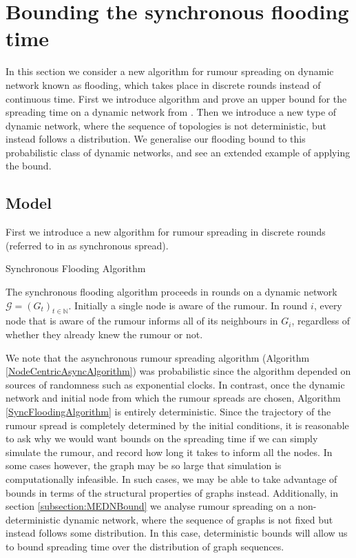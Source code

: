 \section{Bounding the synchronous flooding time}
\label{SyncFloodingSection}

In this section we consider a new algorithm for rumour spreading on dynamic network known as flooding, which takes place in discrete rounds instead of continuous time. First we introduce algorithm and prove an upper bound for the spreading time on a dynamic network from \cite{syncPaper}. Then we introduce a new type of dynamic network, where the sequence of topologies is not deterministic, but instead follows a distribution. We generalise our flooding bound to this probabilistic class of dynamic networks, and see an extended example of applying the bound.

\subsection{Model}

First we introduce a new algorithm for rumour spreading in discrete rounds (referred to in \cite{asyncPaper} as synchronous spread).

\begin{definition} \label{SyncFloodingAlgorithm}
	Synchronous Flooding Algorithm

	\noindent
	The synchronous flooding algorithm proceeds in rounds on a dynamic network $\mathcal{G} = (G_t)_{t \in \mathbb{N}}$. Initially a single node is aware of the rumour. In round $i$, every node that is aware of the rumour informs all of its neighbours in $G_i$, regardless of whether they already knew the rumour or not.
\end{definition}

We note that the asynchronous rumour spreading algorithm (Algorithm \ref{NodeCentricAsyncAlgorithm}) was probabilistic since the algorithm depended on sources of randomness such as exponential clocks. In contrast, once the dynamic network and initial node from which the rumour spreads are chosen, Algorithm \ref{SyncFloodingAlgorithm} is entirely deterministic. Since the trajectory of the rumour spread is completely determined by the initial conditions, it is reasonable to ask why we would want bounds on the spreading time if we can simply simulate the rumour, and record how long it takes to inform all the nodes. In some cases however, the graph may be so large that simulation is computationally infeasible. 
In such cases, we may be able to take advantage of bounds in terms of the structural properties of graphs instead. %
Additionally, in section \ref{subsection:MEDNBound}
we analyse rumour spreading on a non-deterministic dynamic network, where the sequence of graphs is not fixed but instead follows some distribution. 
In this case, deterministic bounds will allow us to bound spreading time over the distribution of graph sequences. %

